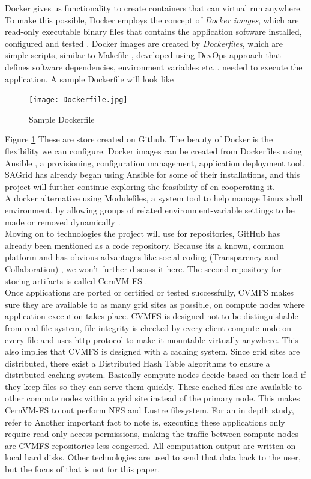 \documentclass [titlepage,11pt]{article}
\begin{document}
Docker gives us functionality to create containers that can virtual run anywhere. To make this possible, Docker employs the concept of \emph{Docker images}, which are read-only executable binary files that contains the application software installed, configured and tested \cite{carl15}. Docker images are created by \emph{Dockerfiles}, which are simple scripts, similar to Makefile \citep{makefile}, developed using DevOps approach that defines software dependencies, environment variables etc... needed to execute the application. A sample Dockerfile will look like 
\begin{figure}[!ht]
\centering
\texttt{[image: Dockerfile.jpg]}
\caption{Sample Dockerfile}
\label{dockerfile}
\end{figure}
Figure \ref{dockerfile} These are store created on Github.
The beauty of Docker is the flexibility we can configure. Docker images can be created from Dockerfiles using Ansible \citep{ansible}, a provisioning, configuration management, application deployment tool. SAGrid has already began using Ansible for some of their installations, and this project will further continue exploring the feasibility of en-cooperating it. \\

A docker alternative using Modulefiles, a system tool to help manage Linux shell environment, by allowing groups of related environment-variable settings to be made or removed dynamically \citep{module}. \\

Moving on to technologies the project will use for repositories, GitHub has already been mentioned as a code repository. Because its a known, common platform and has obvious advantages like social coding (Transparency and Collaboration) \citep{dabbish12}, we won't further discuss it here. The second repository for storing artifacts is called CernVM-FS \citep{cvmfs}. \\

Once applications are ported or certified or tested successfully, CVMFS makes sure they are available to as many grid sites as possible, on compute nodes where application execution takes place. CVMFS is designed not to be distinguishable from real file-system, file integrity is checked by every client compute node on every file and uses http protocol to make it mountable virtually anywhere. This also implies that CVMFS is designed with a caching system. Since grid sites are distributed, there exist a Distributed Hash Table algorithms to ensure a distributed caching system. Basically compute nodes decide based on their load if they keep files so they can serve them quickly. These cached files are available to other compute nodes within a grid site instead of the primary node. This makes CernVM-FS to out perform NFS and Lustre filesystem. For an in depth study, refer to \citep{blomer12} Another important fact to note is, executing these applications only require read-only access permissions, making the traffic between compute nodes are CVMFS repositories less congested. All computation output are written on local hard disks. Other technologies are used to send that data back to the user, but the focus of that is not for this paper. 
\end{document}
